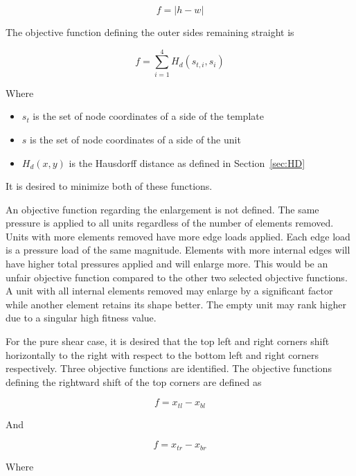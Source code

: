 \begin{equation}
	f=\left | h-w \right |
\end{equation}

The objective function defining the outer sides remaining straight is

\begin{equation}
	f=\sum_{i=1}^{4}H_{d}\left ( s_{t,i},s_{i} \right )
\end{equation}

Where

\begin{itemize}
	\item $s_{t}$ is the set of node coordinates of a side of the template
	\item $s$ is the set of node coordinates of a side of the unit
	\item $H_{d}\left ( x,y \right )$ is the Hausdorff distance as defined in Section~\ref{sec:HD}
\end{itemize}

It is desired to minimize both of these functions.

An objective function regarding the enlargement is not defined. The same pressure is applied to all units regardless of the number of elements removed. Units with more elements removed have more edge loads applied. Each edge load is a pressure load of the same magnitude. Elements with more internal edges will have higher total pressures applied and will enlarge more. This would be an unfair objective function compared to the other two selected objective functions. A unit with all internal elements removed may enlarge by a significant factor while another element retains its shape better. The empty unit may rank higher due to a singular high fitness value.

For the pure shear case, it is desired that the top left and right corners shift horizontally to the right with respect to the bottom left and right corners respectively. Three objective functions are identified. The objective functions defining the rightward shift of the top corners are defined as

\begin{equation}
	f=x_{tl}-x_{bl}
\end{equation}

And

\begin{equation}
	f=x_{tr}-x_{br}
\end{equation}

Where

